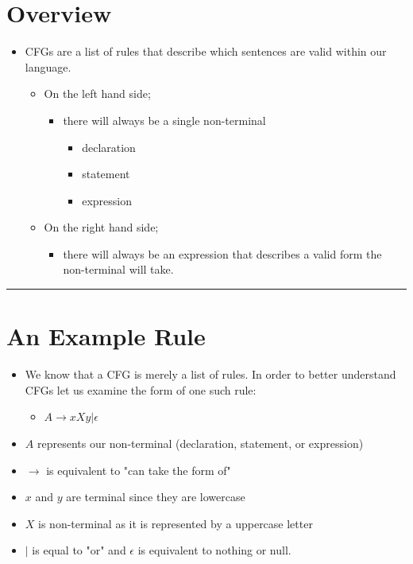 \documentclass{article}
\begin{document}
\section{Overview}
\begin{itemize}
	\item CFGs are a list of rules that describe which sentences are valid within our language. 
	\begin{itemize}
		\item On the left hand side;
		\begin{itemize}
			\item there will always be a single non-terminal
			\begin{itemize}
				\item declaration
				\item statement
				\item expression
			\end{itemize}
		\end{itemize}
		\item On the right hand side;
		\begin{itemize}
			\item there will always be an expression that describes a valid form the non-terminal will take.
		\end{itemize}
	\end{itemize}
\end{itemize}

{\hrule}

\section{An Example Rule}
\begin{itemize}
	\item We know that a CFG is merely a list of rules. In order to better understand CFGs let us examine the form of one such
		rule:
	\begin{itemize}
		\item $A\rightarrow xXy|\epsilon$
	\end{itemize}
	\item $A$ represents our non-terminal (declaration, statement, or expression)
	\item $\rightarrow$ is equivalent to "can take the form of"
	\item $x$ and $y$ are terminal since they are lowercase
	\item $X$ is non-terminal as it is represented by a uppercase letter
	\item $|$ is equal to "or" and $\epsilon$ is equivalent to nothing or null.
\end{itemize}
\end{document}

